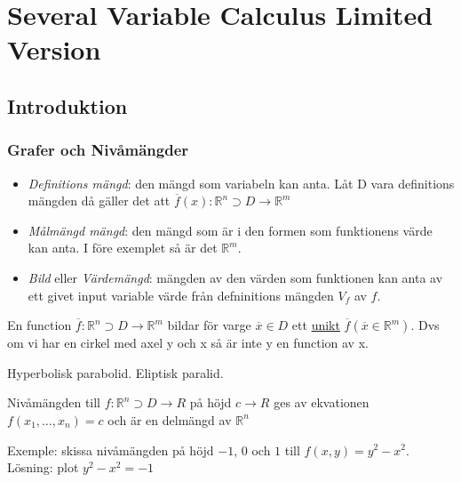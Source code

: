\chapter{Several Variable Calculus Limited Version}

\newcommand{\svc}{image/chap26_svc}
\section{Introduktion}

\subsection{Grafer och Nivåmängder}
\begin{itemize}
    \item \textit{Definitions mängd}: den mängd som variabeln kan anta. Låt D vara definitions mängden då gäller det att $\overline{f}(x): \mathbb{R}^n \supset D \to \mathbb{R}^m$
    \item \textit{Målmängd mängd}: den mängd som är i den formen som funktionens värde kan anta. I före exemplet så är det $\mathbb{R}^m$.
    \item \textit{Bild} eller \textit{Värdemängd}: mängden av den värden som funktionen kan anta av ett givet input variable värde från defninitions mängden $V_f$ av $f$. 
\end{itemize}

En function $\overline{f}: \mathbb{R}^n \supset D \to \mathbb{R}^m$ bildar för varge $\overline{x}\in D$ ett \underline{unikt} $\overline{f}(\overline{x}\in\mathbb{R}^m)$.
Dvs om vi har en cirkel med axel y och x så är inte y en function av x.

Hyperbolisk parabolid.
Eliptisk paralid.

Nivåmängden till $f:\mathbb{R}^n \supset D \to R$ på höjd $c\to R$ ges av ekvationen $f(x_1,\ldots, x_n) = c$
och är en delmängd av $\mathbb{R}^n$

Exemple: skissa nivåmängden på höjd $-1$, $0$ och $1$ till $f(x,y) = y^2 - x^2$.
Lösning: plot $y^2-x^2=-1$


\newpage
